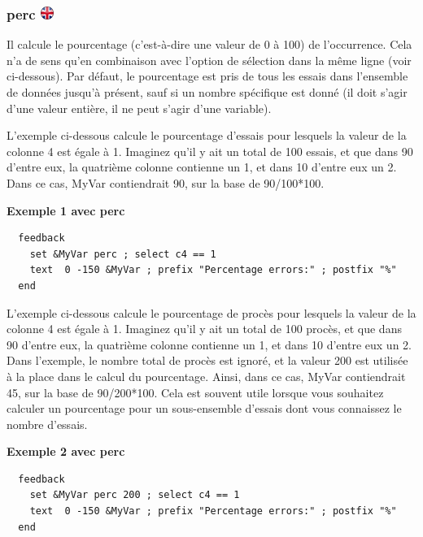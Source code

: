 \documentclass[
]{book}
\begin{document}
\hypertarget{perc-ukflag}{%
\subsubsection[perc ]{\texorpdfstring{perc
\href{https://www.psytoolkit.org/doc3.1.0/feedback.html\#_perc}{\protect\includegraphics{img/ukflag.png}}}{perc ukflag}}\label{perc-ukflag}}

Il calcule le pourcentage (c'est-à-dire une valeur de 0 à 100) de
l'occurrence. Cela n'a de sens qu'en combinaison avec l'option de
sélection dans la même ligne (voir ci-dessous). Par défaut, le
pourcentage est pris de tous les essais dans l'ensemble de données
jusqu'à présent, sauf si un nombre spécifique est donné (il doit s'agir
d'une valeur entière, il ne peut s'agir d'une variable).

L'exemple ci-dessous calcule le pourcentage d'essais pour lesquels la
valeur de la colonne 4 est égale à 1. Imaginez qu'il y ait un total de
100 essais, et que dans 90 d'entre eux, la quatrième colonne contienne
un 1, et dans 10 d'entre eux un 2. Dans ce cas, MyVar contiendrait 90,
sur la base de 90/100*100.

\textbf{Exemple 1 avec perc}

\begin{verbatim}
  feedback
    set &MyVar perc ; select c4 == 1
    text  0 -150 &MyVar ; prefix "Percentage errors:" ; postfix "%"
  end
\end{verbatim}

L'exemple ci-dessous calcule le pourcentage de procès pour lesquels la
valeur de la colonne 4 est égale à 1. Imaginez qu'il y ait un total de
100 procès, et que dans 90 d'entre eux, la quatrième colonne contienne
un 1, et dans 10 d'entre eux un 2. Dans l'exemple, le nombre total de
procès est ignoré, et la valeur 200 est utilisée à la place dans le
calcul du pourcentage. Ainsi, dans ce cas, MyVar contiendrait 45, sur la
base de 90/200*100. Cela est souvent utile lorsque vous souhaitez
calculer un pourcentage pour un sous-ensemble d'essais dont vous
connaissez le nombre d'essais.

\textbf{Exemple 2 avec perc}

\begin{verbatim}
  feedback
    set &MyVar perc 200 ; select c4 == 1
    text  0 -150 &MyVar ; prefix "Percentage errors:" ; postfix "%"
  end
  
\end{verbatim}
\end{document}

